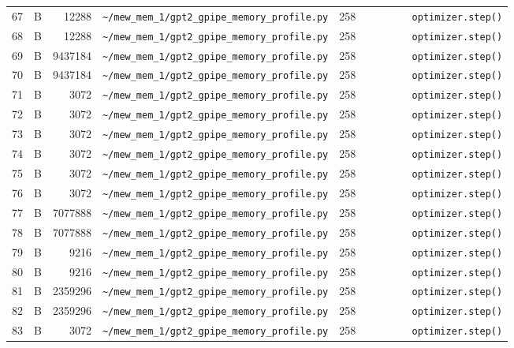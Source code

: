 \documentclass{article}
\begin{document}
\begin{longtable}{r l r p{6.5cm} r p{7.0cm}}
67 & B & 12288 & \lstinline|~/mew_mem_1/gpt2_gpipe_memory_profile.py| & 258 & \lstinline|        optimizer.step()| \\
68 & B & 12288 & \lstinline|~/mew_mem_1/gpt2_gpipe_memory_profile.py| & 258 & \lstinline|        optimizer.step()| \\
69 & B & 9437184 & \lstinline|~/mew_mem_1/gpt2_gpipe_memory_profile.py| & 258 & \lstinline|        optimizer.step()| \\
70 & B & 9437184 & \lstinline|~/mew_mem_1/gpt2_gpipe_memory_profile.py| & 258 & \lstinline|        optimizer.step()| \\
71 & B & 3072 & \lstinline|~/mew_mem_1/gpt2_gpipe_memory_profile.py| & 258 & \lstinline|        optimizer.step()| \\
72 & B & 3072 & \lstinline|~/mew_mem_1/gpt2_gpipe_memory_profile.py| & 258 & \lstinline|        optimizer.step()| \\
73 & B & 3072 & \lstinline|~/mew_mem_1/gpt2_gpipe_memory_profile.py| & 258 & \lstinline|        optimizer.step()| \\
74 & B & 3072 & \lstinline|~/mew_mem_1/gpt2_gpipe_memory_profile.py| & 258 & \lstinline|        optimizer.step()| \\
75 & B & 3072 & \lstinline|~/mew_mem_1/gpt2_gpipe_memory_profile.py| & 258 & \lstinline|        optimizer.step()| \\
76 & B & 3072 & \lstinline|~/mew_mem_1/gpt2_gpipe_memory_profile.py| & 258 & \lstinline|        optimizer.step()| \\
77 & B & 7077888 & \lstinline|~/mew_mem_1/gpt2_gpipe_memory_profile.py| & 258 & \lstinline|        optimizer.step()| \\
78 & B & 7077888 & \lstinline|~/mew_mem_1/gpt2_gpipe_memory_profile.py| & 258 & \lstinline|        optimizer.step()| \\
79 & B & 9216 & \lstinline|~/mew_mem_1/gpt2_gpipe_memory_profile.py| & 258 & \lstinline|        optimizer.step()| \\
80 & B & 9216 & \lstinline|~/mew_mem_1/gpt2_gpipe_memory_profile.py| & 258 & \lstinline|        optimizer.step()| \\
81 & B & 2359296 & \lstinline|~/mew_mem_1/gpt2_gpipe_memory_profile.py| & 258 & \lstinline|        optimizer.step()| \\
82 & B & 2359296 & \lstinline|~/mew_mem_1/gpt2_gpipe_memory_profile.py| & 258 & \lstinline|        optimizer.step()| \\
83 & B & 3072 & \lstinline|~/mew_mem_1/gpt2_gpipe_memory_profile.py| & 258 & \lstinline|        optimizer.step()| \\

\end{longtable}
\end{document}
